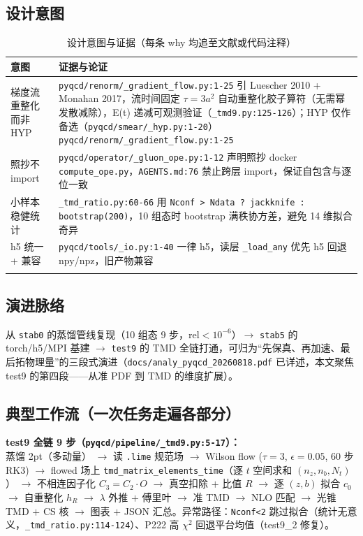 \documentclass[UTF8]{ctexart}
\begin{document}
\subsection{设计意图}
\tiny
\begin{xltabular}{\textwidth}{lX}
\toprule
意图 & 证据与论证 \\
\midrule
\endhead
梯度流重整化而非 HYP & \texttt{\nolinkurl{pyqcd/renorm/\_gradient\_flow.py:1-25}} 引 Luescher 2010 + Monahan 2017，流时间固定 $\tau=3a^2$ 自动重整化胶子算符（无需幂发散减除），E(t) 递减可观测验证（\texttt{\nolinkurl{\_tmd9.py:125-126}}）；HYP 仅作备选（\texttt{\nolinkurl{pyqcd/smear/\_hyp.py:1-20}}）\textcolor{evidence}{\texttt{\nolinkurl{pyqcd/renorm/\_gradient\_flow.py:1-25}}} \\
照抄不 import & \texttt{\nolinkurl{pyqcd/operator/\_gluon\_ope.py:1-12}} 声明照抄 docker \texttt{\nolinkurl{compute\_ope.py}}，\texttt{\nolinkurl{AGENTS.md:76}} 禁止跨层 import，保证自包含与逐位一致 \\
小样本稳健统计 & \texttt{\nolinkurl{\_tmd\_ratio.py:60-66}} 用 \texttt{\nolinkurl{Nconf > Ndata ? jackknife : bootstrap(200)}}，10 组态时 bootstrap 满秩协方差，避免 14 维拟合奇异 \\
h5 统一 + 兼容 & \texttt{\nolinkurl{pyqcd/tools/\_io.py:1-40}} 一律 h5，读层 \texttt{\nolinkurl{\_load\_any}} 优先 h5 回退 npy/npz，旧产物兼容 \\
\bottomrule
\caption{设计意图与证据（每条 why 均追至文献或代码注释）}
\end{xltabular}

\subsection{演进脉络}
从 \texttt{\nolinkurl{stab0}} 的蒸馏管线复现（10 组态 9 步，rel$<10^{-6}$）$\rightarrow$ \texttt{\nolinkurl{stab5}} 的 torch/h5/MPI 基建 $\rightarrow$ \texttt{\nolinkurl{test9}} 的 TMD 全链打通，可归为“先保真、再加速、最后拓物理量”的三段式演进（\texttt{\nolinkurl{docs/analy\_pyqcd\_20260818.pdf}} 已详述，本文聚焦 test9 的第四段——从准 PDF 到 TMD 的维度扩展）。

\subsection{典型工作流（一次任务走遍各部分）}
\begin{ideabox}
\textbf{test9 全链 9 步（\texttt{\nolinkurl{pyqcd/pipeline/\_tmd9.py:5-17}}）：}\\
蒸馏 2pt（多动量） $\rightarrow$ 读 \texttt{\nolinkurl{.lime}} 规范场 $\rightarrow$ Wilson flow ($\tau=3$, $\epsilon=0.05$, 60 步 RK3) $\rightarrow$ flowed 场上 \texttt{\nolinkurl{tmd\_matrix\_elements\_time}}（逐 $t$ 空间求和 $(n_z,n_b,N_t)$） $\rightarrow$ 不相连因子化 $C_3=C_2\cdot O$ $\rightarrow$ 真空扣除 $+$ 比值 $R$ $\rightarrow$ 逐 $(z,b)$ 拟合 $c_0$ $\rightarrow$ 自重整化 $h_R$ $\rightarrow$ $\lambda$ 外推 $+$ 傅里叶 $\rightarrow$ 准 TMD $\rightarrow$ NLO 匹配 $\rightarrow$ 光锥 TMD $+$ CS 核 $\rightarrow$ 图表 $+$ JSON 汇总。异常路径：\texttt{\nolinkurl{Nconf<2}} 跳过拟合（统计无意义，\texttt{\nolinkurl{\_tmd\_ratio.py:114-124}}）、P222 高 $\chi^2$ 回退平台均值（test9\_2 修复）。
\end{ideabox}
\end{document}
